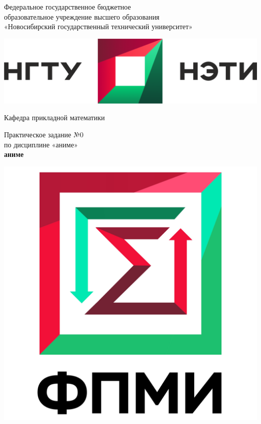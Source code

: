 \documentclass[12pt, a4paper]{report}
\begin{document}
\begin{center}
\begin{Large}

\bigskip
\bigskip

Федеральное государственное бюджетное  \\
образовательное учреждение высшего образования \\
«Новосибирский государственный технический университет»

\bigskip
\bigskip
\bigskip

\includegraphics[scale=0.35]{nstu_with_text_horizontal}

\bigskip
\bigskip

Кафедра прикладной математики

\bigskip

Практическое задание №0 \\
по дисциплине «аниме» \\

\textbf{аниме}

\bigskip
\bigskip

\end{Large}

\begin{minipage}{0.3 \textwidth}

\includegraphics[scale=0.16]{fpmi}


\end{minipage}
\end{center}
\end{document}
